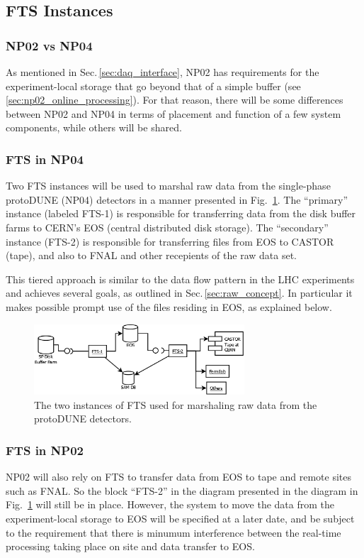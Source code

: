 \documentclass[pdftex,12pt,letter]{article}
\begin{document}
\subsection{FTS Instances}
\label{sec:instances}
\subsubsection{NP02 vs NP04}
As mentioned in Sec.\,\ref{sec:daq_interface}, NP02 has requirements for the experiment-local storage that go beyond
that of a simple buffer (see\,\ref{sec:np02_online_processing}). For that reason, there will be some differences between
NP02 and NP04 in terms of placement and function of a few system components, while others will be shared.

\subsubsection{FTS in NP04}
\label{sec:prim_sec}
Two FTS instances will be used to marshal raw data from the single-phase protoDUNE (NP04)
detectors in a manner presented in Fig.~\ref{fig:ftsinstances}.  The
``primary'' instance (labeled FTS-1) is responsible for transferring data
from the disk buffer farms to CERN's EOS (central distributed disk storage).
 The ``secondary'' instance (FTS-2) is responsible for transferring files from EOS to
CASTOR (tape), and also to FNAL and other recepients of the raw data set.

This tiered approach is similar to the data flow pattern in the LHC experiments and achieves several goals,
as outlined in Sec.\,\ref{sec:raw_concept}. In particular
it makes possible prompt use of the files residing in EOS, as explained below.

\begin{figure}[tbh]
  \centering
  \includegraphics[width=0.7\textwidth]{ftsinstances_v2.png}
  \caption{The two instances of FTS used for marshaling raw data from the protoDUNE detectors.}
  \label{fig:ftsinstances}
\end{figure}

\subsubsection{FTS in NP02}
NP02 will also rely on FTS to transfer data from EOS to tape and remote sites such as FNAL.
So the block ``FTS-2'' in the diagram presented in the diagram in Fig.~\ref{fig:ftsinstances} will still be in place.
However, the system to move the data from the experiment-local storage to EOS will be specified at a later date,
and be subject to the requirement that there is minumum interference between the real-time processing
taking place on site and data transfer to EOS.
\end{document}
